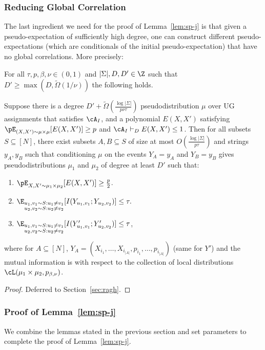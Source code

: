 \subsubsection{Reducing Global Correlation}
The last ingredient we need for the proof of Lemma~\ref{lem:sp-j} is 
that given a pseudo-expectation of sufficiently high degree, one can 
construct different pseudo-expectations (which are conditionals 
of the initial pseudo-expectation) that have no global correlations.
More precisely:
\begin{lemma}\label{lem:ragh-tan-appln}
For all $\tau,p,\beta,\nu \in (0,1)$ and $|\Sigma|, D, D' \in \Z$ 
such that $D' \geq \max(D,\widetilde{\Omega}(1/\nu))$ the following holds.

Suppose there is a degree $D' + \widetilde{\Omega}(\frac{\log |\Sigma|}{p \nu \tau})$ pseudodistribution $\mu$ over UG assignments that satisfies $\cA_I$, and a polynomial $E(X,X')$ satisfying $\pE_{(X,X') \sim \mu \times \mu}[E(X,X')] \geq p$ and $\cA_I \vdash_D E(X,X') \leq 1$. Then for all subsets $S \subseteq [N]$, there exist subsets $A, B \subseteq S$ of size at most $O(\frac{\log|\Sigma|}{p\tau})$ and strings $y_A, y_B$ such that conditioning $\mu$ on the events $Y_A = y_A$ and $Y_B = y_B$ gives pseudodistributions $\mu_1$ and $\mu_2$ of degree at least $D'$ such that: 
\begin{enumerate}
\item $\pE_{X,X'\sim \mu_1\times\mu_2}[E(X,X')] \geq \frac{p}{2}$.
\item $\E_{\substack{u_1,v_1 \sim S: u_1 \neq v_1\\ u_2,v_2 \sim S: u_2 \neq v_2}}[I(Y_{u_1,v_1};Y_{u_2,v_2})] \leq \tau.$
\item $\E_{\substack{u_1,v_1 \sim S: u_1 \neq v_1\\ u_2,v_2 \sim S: u_2 \neq v_2}}[I(Y'_{u_1,v_1};Y'_{u_2,v_2})] \leq \tau$,
\end{enumerate}
where for $A \subseteq [N]$, $Y_{A} = (X_{i_1},\ldots, X_{i_{|A|}},p_{i_1},\ldots, p_{i_{|A|}})$ (same for $Y'$) and the mutual information is with respect to the collection of local distributions $\cL(\mu_1 \times \mu_2,p_{\beta,\nu})$.
\end{lemma}
\begin{proof}
Deferred to Section~\ref{sec:ragh}.
\end{proof}

\subsubsection{Proof of Lemma~\ref{lem:sp-j}}
We combine the lemmas stated in the previous section and set parameters to complete the proof of Lemma~\ref{lem:sp-j}.

